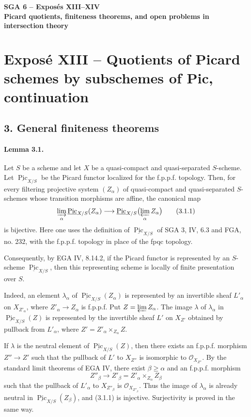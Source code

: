 \documentclass[12pt]{article}
\newcommand{\cO}{\mathcal O}
\newcommand{\Pic}{\operatorname{Pic}}
\newcommand{\longto}{\longrightarrow}
\begin{document}
\begin{center}
{\Large\textbf{SGA 6 -- Exposés XIII--XIV}}\\[0.35em]
{\large\textbf{Picard quotients, finiteness theorems, and open problems in intersection theory}}
\end{center}

\section*{Exposé XIII -- Quotients of Picard schemes by subschemes of Pic, continuation}

\subsection*{3. General finiteness theorems}

\paragraph{Lemma 3.1.}
Let $S$ be a scheme and let $X$ be a quasi-compact and quasi-separated $S$-scheme. Let $\underline{\Pic}_{X/S}$ be the Picard functor localized for the f.p.p.f. topology. Then, for every filtering projective system $(Z_\alpha)$ of quasi-compact and quasi-separated $S$-schemes whose transition morphisms are affine, the canonical map
\[
\varinjlim_\alpha \underline{\Pic}_{X/S}(Z_\alpha)
   \longto
\underline{\Pic}_{X/S}\bigl(\varprojlim_\alpha Z_\alpha\bigr)
\tag{3.1.1}
\]
is bijective. Here one uses the definition of $\underline{\Pic}_{X/S}$ of SGA 3, IV, 6.3 and FGA, no. 232, with the f.p.p.f. topology in place of the fpqc topology.

Consequently, by EGA IV, 8.14.2, if the Picard functor is represented by an $S$-scheme $\underline{\Pic}_{X/S}$, then this representing scheme is locally of finite presentation over $S$.

Indeed, an element $\lambda_\alpha$ of $\underline{\Pic}_{X/S}(Z_\alpha)$ is represented by an invertible sheaf $L'_\alpha$ on $X_{Z'_\alpha}$, where $Z'_\alpha\to Z_\alpha$ is f.p.p.f. Put $Z=\varprojlim Z_\alpha$. The image $\lambda$ of $\lambda_\alpha$ in $\underline{\Pic}_{X/S}(Z)$ is represented by the invertible sheaf $L'$ on $X_{Z'}$ obtained by pullback from $L'_\alpha$, where $Z'=Z'_\alpha\times_{Z_\alpha}Z$.

If $\lambda$ is the neutral element of $\underline{\Pic}_{X/S}(Z)$, then there exists an f.p.p.f. morphism $Z''\to Z'$ such that the pullback of $L'$ to $X_{Z''}$ is isomorphic to $\cO_{X_{Z''}}$. By the standard limit theorems of EGA IV, there exist $\beta\geq\alpha$ and an f.p.p.f. morphism
\[
Z''_\beta \longto Z'_\beta=Z'_\alpha\times_{Z_\alpha}Z_\beta
\]
such that the pullback of $L'_\alpha$ to $X_{Z''_\beta}$ is $\cO_{X_{Z''_\beta}}$. Thus the image of $\lambda_\alpha$ is already neutral in $\underline{\Pic}_{X/S}(Z_\beta)$, and (3.1.1) is injective. Surjectivity is proved in the same way.
\end{document}
